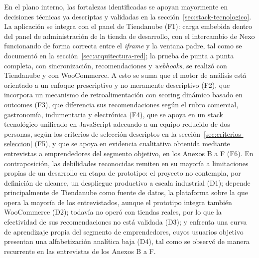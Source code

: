 En el plano interno, las fortalezas identificadas se apoyan mayormente en decisiones técnicas ya descriptas y validadas en la sección~\ref{sec:stack-tecnologico}. La aplicación se integra con el panel de Tiendanube (F1): carga embebida dentro del panel de administración de la tienda de desarrollo, con el intercambio de Nexo funcionando de forma correcta entre el \emph{iframe} y la ventana padre, tal como se documentó en la sección~\ref{sec:arquitectura-red}; la prueba de punta a punta completa, con sincronización, recomendaciones y \emph{webhooks}, se realizó con Tiendanube y con WooCommerce. A esto se suma que el motor de análisis está orientado a un enfoque prescriptivo y no meramente descriptivo (F2), que incorpora un mecanismo de retroalimentación con scoring dinámico basado en outcomes (F3), que diferencia sus recomendaciones según el rubro comercial, gastronomía, indumentaria y electrónica (F4), que se apoya en un stack tecnológico unificado en JavaScript adecuado a un equipo reducido de dos personas, según los criterios de selección descriptos en la sección~\ref{sec:criterios-seleccion} (F5), y que se apoya en evidencia cualitativa obtenida mediante entrevistas a emprendedores del segmento objetivo, en los Anexos B a F (F6). En contraposición, las debilidades reconocidas remiten en su mayoría a limitaciones propias de un desarrollo en etapa de prototipo: el proyecto no contempla, por definición de alcance, un despliegue productivo a escala industrial (D1); depende principalmente de Tiendanube como fuente de datos, la plataforma sobre la que opera la mayoría de los entrevistados, aunque el prototipo integra también WooCommerce (D2); todavía no operó con tiendas reales, por lo que la efectividad de sus recomendaciones no está validada (D3); y enfrenta una curva de aprendizaje propia del segmento de emprendedores, cuyos usuarios objetivo presentan una alfabetización analítica baja (D4), tal como se observó de manera recurrente en las entrevistas de los Anexos B a F.


